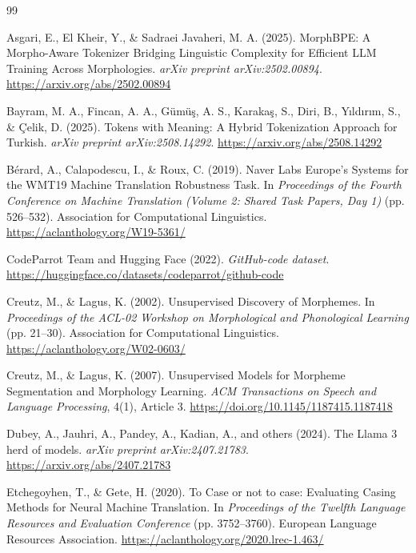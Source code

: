 \documentclass{article}
\begin{document}
\begin{thebibliography}{99}

Asgari, E., El Kheir, Y., \& Sadraei Javaheri, M. A. (2025). MorphBPE: A Morpho-Aware Tokenizer Bridging Linguistic Complexity for Efficient LLM Training Across Morphologies. \emph{arXiv preprint arXiv:2502.00894}. \url{https://arxiv.org/abs/2502.00894}

Bayram, M. A., Fincan, A. A., G{\"u}m{\"u}{\c{s}}, A. S., Karaka{\c{s}}, S., Diri, B., Y{\i}ld{\i}r{\i}m, S., \& {\c{C}}elik, D. (2025). Tokens with Meaning: A Hybrid Tokenization Approach for Turkish. \emph{arXiv preprint arXiv:2508.14292}. \url{https://arxiv.org/abs/2508.14292}

B{\'e}rard, A., Calapodescu, I., \& Roux, C. (2019). Naver Labs Europe's
Systems for the WMT19 Machine Translation Robustness Task. In
\emph{Proceedings of the Fourth Conference on Machine Translation
(Volume 2: Shared Task Papers, Day 1)} (pp. 526--532). Association for
Computational Linguistics. \url{https://aclanthology.org/W19-5361/}

CodeParrot Team and Hugging Face (2022). \emph{GitHub-code dataset}. \url{https://huggingface.co/datasets/codeparrot/github-code}

Creutz, M., \& Lagus, K. (2002). Unsupervised Discovery of Morphemes. In \emph{Proceedings of the ACL-02 Workshop on Morphological and Phonological Learning} (pp. 21--30). Association for Computational Linguistics. \url{https://aclanthology.org/W02-0603/}

Creutz, M., \& Lagus, K. (2007). Unsupervised Models for Morpheme Segmentation and Morphology Learning. \emph{ACM Transactions on Speech and Language Processing}, 4(1), Article 3. \url{https://doi.org/10.1145/1187415.1187418}

Dubey, A., Jauhri, A., Pandey, A., Kadian, A., and others (2024). The Llama 3 herd of models. \emph{arXiv preprint arXiv:2407.21783}. \url{https://arxiv.org/abs/2407.21783}

Etchegoyhen, T., \& Gete, H. (2020). To Case or not to case: Evaluating Casing Methods for Neural Machine Translation. In \emph{Proceedings of the Twelfth Language Resources and Evaluation Conference} (pp. 3752--3760). European Language Resources Association. \url{https://aclanthology.org/2020.lrec-1.463/}


\end{thebibliography}
\end{document}
